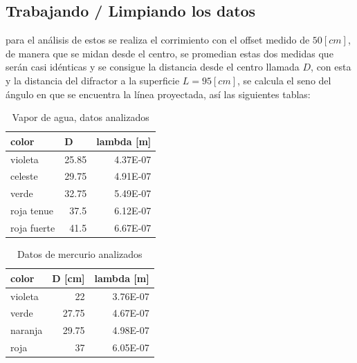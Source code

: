 \documentclass[a4paper,twocolumn,10pt]{article}
\begin{document}
\subsection{Trabajando / Limpiando los datos}
para el análisis de estos se realiza el corrimiento con el offset medido de $50[cm]$, de manera que se midan desde el centro, se promedian estas dos medidas que serán casi idénticas y se consigue la distancia desde el centro llamada $D$, con esta y la distancia del difractor a la superficie $L = 95[cm]$, se calcula el seno del ángulo en que se encuentra la línea proyectada, así las siguientes tablas:

\begin{table}[H]
\centering
\begin{tabular}{|lrr|} 
\hline
color     & \multicolumn{1}{l}{D} & \multicolumn{1}{l|}{lambda [m]}  \\ 
\hline
violeta   & 25.85                 & 4.37E-07                        \\
celeste   & 29.75                 & 4.91E-07                        \\
verde     & 32.75                 & 5.49E-07                        \\
roja tenue & 37.5                  & 6.12E-07                        \\
roja fuerte & 41.5                  & 6.67E-07                        \\
\hline
\end{tabular}
\caption{Vapor de agua, datos analizados}
\end{table}

\begin{table}[H]
\centering
\begin{tabular}{|lrr|}
\hline
color   & \multicolumn{1}{l}{D [cm]} & \multicolumn{1}{l|}{lambda [m]}  \\
\hline
violeta & 22                         & 3.76E-07                                       \\
verde   & 27.75                      & 4.67E-07                                       \\
naranja & 29.75                      & 4.98E-07                                       \\
roja    & 37                         & 6.05E-07    \\    \hline              
\end{tabular}
\caption{Datos de mercurio analizados}
\label{table:mercurio}
\end{table}
\end{document}
